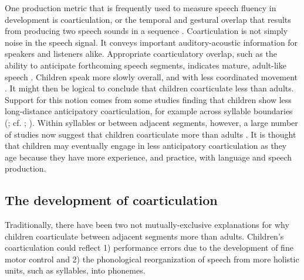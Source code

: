 \documentclass[a4paper,man,natbib,donotrepeattitle, apacite]{apa6}
\begin{document}
One production metric that is frequently used to measure speech fluency in development is coarticulation, or the temporal and gestural overlap that results from producing two speech sounds in a sequence \cite{gerosaAnalyzingChildrenSpeech2006,goffmanBreadthCoarticulatoryUnits2008,zharkovaCoarticulationIndicatorSpeech2011}. Coarticulation is not simply noise in the speech signal. It conveys important auditory-acoustic information for speakers and listeners alike. Appropriate coarticulatory overlap, such as the ability to anticipate forthcoming speech segments, indicates mature, adult-like speech \cite{barbierWhatAnticipatoryCoarticulation2020,bradlowConfluentTalkerListeneroriented2002,whalenCoarticulationLargelyPlanned1990}. Children speak more slowly overall, and with less coordinated movement \cite{greenPhysiologicDevelopmentSpeech2000,goffmanRelationsSegmentalMotor2007,leeAcousticsChildrenSpeech1999}. It might then be logical to conclude that children coarticulate less than adults. Support for this notion comes from some studies finding that children show less long-distance anticipatory coarticulation, for example across syllable boundaries (; cf. ; ). Within syllables or between adjacent segments, however, a large number of studies now suggest that children coarticulate more than adults \cite{nittrouerHowChildrenLearn1996,noirayBackFutureNonlinear2019,zharkovaSpatialTemporalLingual2014}. It is thought that children may eventually engage in less anticipatory coarticulation as they age because they have more experience, and practice, with language and speech production. 

\subsection{The development of coarticulation}

Traditionally, there have been two not mutually-exclusive explanations for why children coarticulate between adjacent segments more than adults. Children’s coarticulation could reflect 1) performance errors due to the development of fine motor control and 2) the phonological reorganization of speech from more holistic units, such as syllables, into phonemes. 
\end{document}
